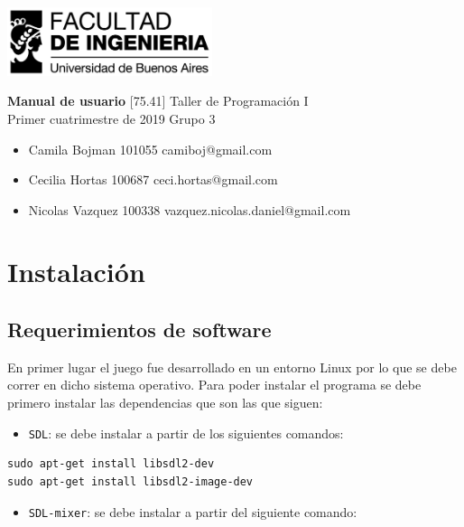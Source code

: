 \documentclass[a4paper]{article}
\newcommand{\materia}{[75.41] Taller de Programación I}
\newcommand{\trabajo}{Manual de usuario}
\newcommand{\cuatrimestre}{Primer cuatrimestre de 2019}
\newcommand{\grupo}{Grupo 3}
\begin{document}
	\setcounter{page}{1}
	
	\begin{titlepage}
		\hfill\includegraphics[width=6cm]{fiuba.jpeg}
		\begin{center}
			\vfill
			\Huge \textbf{\trabajo}
			\vskip2cm
			\Large \materia\\
			\cuatrimestre
			\vfill
			\grupo
			\begin{itemize}
				\item Camila Bojman 101055 camiboj@gmail.com
				\item Cecilia Hortas 100687 ceci.hortas@gmail.com
				\item Nicolas Vazquez 100338 vazquez.nicolas.daniel@gmail.com
			\end{itemize}
			\vskip1cm
		\end{center}
	\end{titlepage}

\section{Instalación}

\subsection{Requerimientos de software}

En primer lugar el juego fue desarrollado en un entorno Linux por lo que se debe correr en dicho sistema operativo. Para poder instalar el programa se debe primero instalar las dependencias que son las que siguen:

\begin{itemize}
	\item \texttt{SDL}: se debe instalar a partir de los siguientes comandos:
\end{itemize}

\begin{verbatim}
sudo apt-get install libsdl2-dev
sudo apt-get install libsdl2-image-dev
\end{verbatim}

\begin{itemize}
	\item \texttt{SDL-mixer}: se debe instalar a partir del siguiente comando:
\end{itemize}
\end{document}
